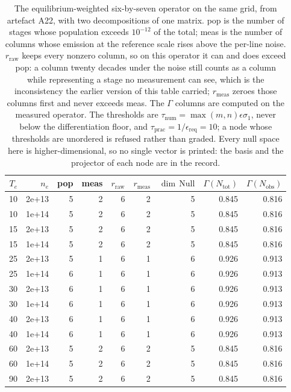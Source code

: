 \begin{table}[htbp]
\centering
\caption{The equilibrium-weighted six-by-seven operator on the same grid, from artefact A22, with two decompositions of one matrix. pop is the number of stages whose population exceeds $10^{-12}$ of the total; meas is the number of columns whose emission at the reference scale rises above the per-line noise. $r_{\mathrm{raw}}$ keeps every nonzero column, so on this operator it can and does exceed pop: a column twenty decades under the noise still counts as a column while representing a stage no measurement can see, which is the inconsistency the earlier version of this table carried; $r_{\mathrm{meas}}$ zeroes those columns first and never exceeds meas. The $\Gamma$ columns are computed on the measured operator. The thresholds are $\tau_{\mathrm{num}}=\max(m,n)\epsilon\sigma_1$, never below the differentiation floor, and $\tau_{\mathrm{prac}}=1/\epsilon_{\mathrm{req}}=10$; a node whose thresholds are unordered is refused rather than graded. Every null space here is higher-dimensional, so no single vector is printed: the basis and the projector of each node are in the record.}
\label{tab:nullspace}
\small
\begin{tabular}{@{}rrrrrrrrr@{}}
\toprule
$T_e$ & $n_e$ & pop & meas & $r_{\mathrm{raw}}$ & $r_{\mathrm{meas}}$ & $\dim\,\mathrm{Null}$ & $\Gamma(N_{\mathrm{tot}})$ & $\Gamma(N_{\mathrm{obs}})$ \\
\midrule
10 & 2e+13 & 5 & 2 & 6 & 2 & 5 & 0.845 & 0.816 \\
10 & 1e+14 & 5 & 2 & 6 & 2 & 5 & 0.845 & 0.816 \\
15 & 2e+13 & 5 & 2 & 6 & 2 & 5 & 0.845 & 0.816 \\
15 & 1e+14 & 5 & 2 & 6 & 2 & 5 & 0.845 & 0.816 \\
25 & 2e+13 & 5 & 1 & 6 & 1 & 6 & 0.926 & 0.913 \\
25 & 1e+14 & 6 & 1 & 6 & 1 & 6 & 0.926 & 0.913 \\
30 & 2e+13 & 6 & 1 & 6 & 1 & 6 & 0.926 & 0.913 \\
30 & 1e+14 & 6 & 1 & 6 & 1 & 6 & 0.926 & 0.913 \\
40 & 2e+13 & 6 & 1 & 6 & 1 & 6 & 0.926 & 0.913 \\
40 & 1e+14 & 6 & 1 & 6 & 1 & 6 & 0.926 & 0.913 \\
60 & 2e+13 & 5 & 2 & 6 & 2 & 5 & 0.845 & 0.816 \\
60 & 1e+14 & 5 & 2 & 6 & 2 & 5 & 0.845 & 0.816 \\
90 & 2e+13 & 5 & 2 & 6 & 2 & 5 & 0.845 & 0.816 \\

\end{tabular}
\end{table}
